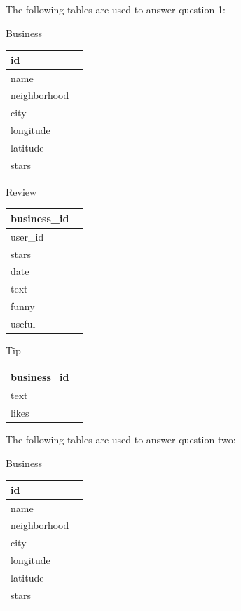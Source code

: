 \documentclass{neu_handout}
\begin{document}
The following tables are used to answer question 1:\\

\begin{center}
Business\\
\begin{tabular}{|l|l|}
\hline
id  \\ \hline
name  \\ \hline
neighborhood  \\ \hline
city  \\ \hline
longitude  \\ \hline
latitude  \\ \hline
stars  \\ \hline
\end{tabular}
\end{center}

\begin{center}
Review\\
\begin{tabular}{|l|l|}
\hline
business\_id  \\ \hline
user\_id  \\ \hline
stars  \\ \hline
date  \\ \hline
text  \\ \hline
funny  \\ \hline
useful  \\ \hline
\end{tabular}
\end{center}

\begin{center}
Tip\\
\begin{tabular}{|l|l|}
\hline
business\_id  \\ \hline
text  \\ \hline
likes  \\ \hline
\end{tabular}
\end{center}

The following tables are used to answer question two:

\begin{center}
Business\\
\begin{tabular}{|l|l|}
\hline
id  \\ \hline
name  \\ \hline
neighborhood  \\ \hline
city  \\ \hline
longitude  \\ \hline
latitude  \\ \hline
stars  \\ \hline
\end{tabular}
\end{center}
\end{document}
